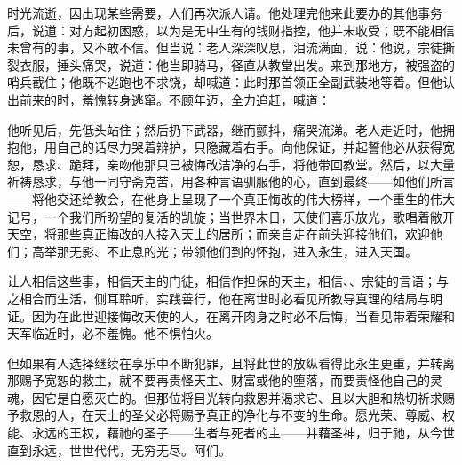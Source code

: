 时光流逝，因出现某些需要，人们再次派人请。他处理完他来此要办的其他事务后，说道：对方起初困惑，以为是无中生有的钱财指控，他并未收受；既不能相信未曾有的事，又不敢不信。但当说：老人深深叹息，泪流满面，说：他说，宗徒撕裂衣服，捶头痛哭，说道：他当即骑马，径直从教堂出发。来到那地方，被强盗的哨兵截住；他既不逃跑也不求饶，却喊道：此时那首领正全副武装地等着。但他认出前来的时，羞愧转身逃窜。不顾年迈，全力追赶，喊道：\par

他听见后，先低头站住；然后扔下武器，继而颤抖，痛哭流涕。老人走近时，他拥抱他，用自己的话尽力哭着辩护，只隐藏着右手。向他保证，并起誓他必从获得宽恕，恳求、跪拜，亲吻他那只已被悔改洁净的右手，将他带回教堂。然后，以大量祈祷恳求，与他一同守斋克苦，用各种言语驯服他的心，直到最终——如他们所言——将他交还给教会，在他身上呈现了一个真正悔改的伟大榜样，一个重生的伟大记号，一个我们所盼望的复活的凯旋；当世界末日，天使们喜乐放光，歌唱着敞开天空，将那些真正悔改的人接入天上的居所；而亲自走在前头迎接他们，欢迎他们；高举那无影、不止息的光；带领他们到的怀抱，进入永生，进入天国。\par

让人相信这些事，相信天主的门徒，相信作担保的天主，相信、、宗徒的言语；与之相合而生活，侧耳聆听，实践善行，他在离世时必看见所教导真理的结局与明证。因为在此世迎接悔改天使的人，在离开肉身之时必不后悔，当看见带着荣耀和天军临近时，必不羞愧。他不惧怕火。\par

但如果有人选择继续在享乐中不断犯罪，且将此世的放纵看得比永生更重，并转离那赐予宽恕的救主，就不要再责怪天主、财富或他的堕落，而要责怪他自己的灵魂，因它是自愿灭亡的。但那位将目光转向救恩并渴求它、且以大胆和热切祈求赐予救恩的人，在天上的圣父必将赐予真正的净化与不变的生命。愿光荣、尊威、权能、永远的王权，藉祂的圣子——生者与死者的主——并藉圣神，归于祂，从今世直到永远，世世代代，无穷无尽。阿们。\par

